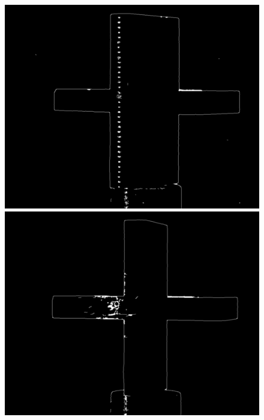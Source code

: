 \begin{figure}[ht!]
	\begin{minipage}[t]{0.3\textwidth}
		\centering	
		\includegraphics[width=1\textwidth]{figures/ImageAnalysis/Canny/s1.png}
	\end{minipage}
	\hspace{0.02\textwidth}
	\begin{minipage}[t]{0.3\textwidth}
		\centering	
		\includegraphics[width=1\textwidth]{figures/ImageAnalysis/Canny/s3.png}
	\end{minipage}
	\hspace{0.02\textwidth}
	\begin{minipage}[t]{0.3\textwidth}

\end{minipage}
\end{figure}
